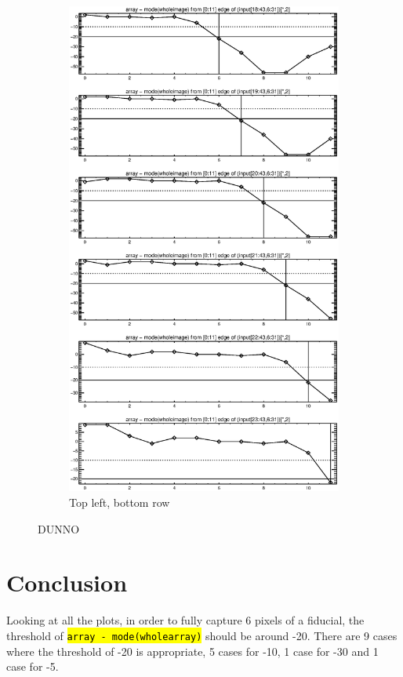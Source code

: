 \documentclass[10pt]{article}
\begin{document}
\begin{figure}[!h]
\begin{subfigure}[b]{.4\linewidth}
        \centering
        \includegraphics[width=1.4\textwidth]{plots_tables_images/topright3.eps} 
        \caption{Top left, bottom row}
    \end{subfigure}
    \caption{DUNNO}
\end{figure}

\clearpage

\section{Conclusion} %
\label{sec:conclusion}
    
    Looking at all the plots, in order to fully capture 6 pixels of a fiducial, the threshold of \hl{\texttt{array - mode(wholearray)}} should be around -20. There are 9 cases where the threshold of -20 is appropriate, 5 cases for -10, 1 case for -30 and 1 case for -5.


\end{document}
